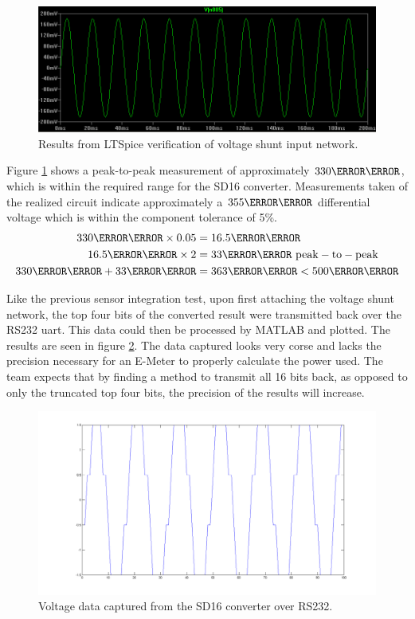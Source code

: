 \begin{figure}[htbp]
  \centering
  \includegraphics[width=5in]{includes/emeterhw/voltage_shunt_trace}
  \caption{Results from LTSpice verification of voltage shunt input network.}
  \label{fig:voltage_shunt_trace}
\end{figure}
Figure \ref{fig:voltage_shunt_trace} shows a peak-to-peak measurement of approximately $330\milli\volt$, which is within the required range for the SD16 converter. Measurements taken of the realized circuit indicate approximately a $355\milli\volt$ differential voltage which is within the component tolerance of 5\%.
\begin{align}
330\milli\volt \times 0.05 &= 16.5\milli\volt\\
16.5\milli\volt \times 2 &= 33\milli\volt\ \mathrm{peak-to-peak}\\
330\milli\volt + 33\milli\volt &= 363\milli\volt < 500\milli\volt
\end{align}

Like the previous sensor integration test, upon first attaching the voltage shunt network, the top four bits of the converted result were transmitted back over the \ac{RS232} uart. This data could then be processed by MATLAB and plotted. The results are seen in figure \ref{fig:4_bit_voltage_shunt}. The data captured looks very corse and lacks the precision necessary for an E-Meter to properly calculate the power used. The team expects that by finding a method to transmit all 16 bits back, as opposed to only the truncated top four bits, the precision of the results will increase.

\begin{figure}[htbp]
  \centering
  \includegraphics[width=5in]{includes/4bit_voltage}
  \caption{Voltage data captured from the SD16 converter over RS232.}
  \label{fig:4_bit_voltage_shunt}
\end{figure}
  
